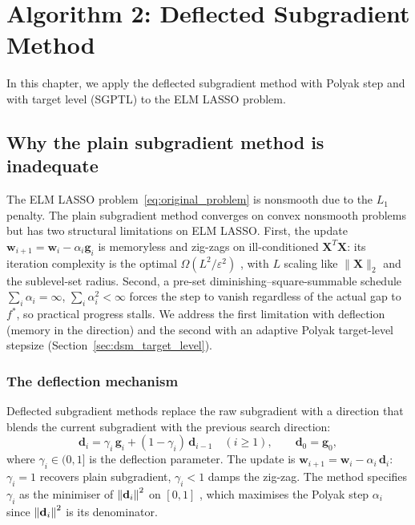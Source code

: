 \chapter{Algorithm 2: Deflected Subgradient Method}
\label{chap:dsm}

In this chapter, we apply the deflected subgradient method with Polyak step and with target level (SGPTL) to the ELM LASSO problem.

\section{Why the plain subgradient method is inadequate}
\label{sec:dsm_motivation}

The ELM LASSO problem~\eqref{eq:original_problem} is nonsmooth due to the $L_1$ penalty. The plain subgradient method converges on convex nonsmooth problems but has two structural limitations on ELM LASSO. First, the update $\mathbf{w}_{i+1} = \mathbf{w}_i - \alpha_i \mathbf{g}_i$ is memoryless \cite[Slide 10]{frangioni-slides-nonsmooth} and zig-zags on ill-conditioned $\mathbf{X}^T\mathbf{X}$: its iteration complexity is the optimal $\Omega(L^2/\varepsilon^2)$ \cite[Theorem~3.2]{bubeck2015convex}, with $L$ scaling like $\|\mathbf{X}\|_2$ and the sublevel-set radius. Second, a pre-set diminishing--square-summable schedule $\sum_i \alpha_i = \infty$, $\sum_i \alpha_i^2 < \infty$ \cite[Slide 10]{frangioni-slides-nonsmooth} forces the step to vanish regardless of the actual gap to $f^*$, so practical progress stalls. We address the first limitation with deflection (memory in the direction) and the second with an adaptive Polyak target-level stepsize (Section~\ref{sec:dsm_target_level}).

\subsection{The deflection mechanism}
\label{sec:dsm_deflection}

Deflected subgradient methods \cite[Slide 15]{frangioni-slides-nonsmooth} replace the raw subgradient with a direction that blends the current subgradient with the previous search direction:
\begin{equation}\label{eq:deflected_dir}
  \mathbf{d}_i = \gamma_i\, \mathbf{g}_i + (1 - \gamma_i)\, \mathbf{d}_{i-1} \quad (i \ge 1), \qquad \mathbf{d}_0 = \mathbf{g}_0,
\end{equation}
where $\gamma_i \in (0,1]$ is the deflection parameter. The update is $\mathbf{w}_{i+1} = \mathbf{w}_i - \alpha_i\, \mathbf{d}_i$: $\gamma_i = 1$ recovers plain subgradient, $\gamma_i < 1$ damps the zig-zag. The method specifies $\gamma_i$ as the minimiser of $\left\lVert \mathbf{d}_i \right\rVert^2$ on $[0,1]$ \cite[Slide 15]{frangioni-slides-nonsmooth}, which maximises the Polyak step $\alpha_i$ since $\left\lVert \mathbf{d}_i \right\rVert^2$ is its denominator.


